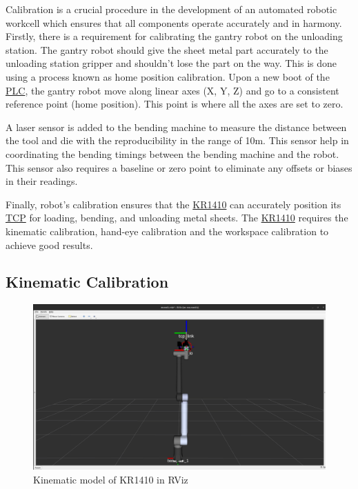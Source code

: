 
Calibration is a crucial procedure in the development of 
an automated robotic workcell which ensures that all components
operate accurately and in harmony. Firstly, there is a requirement for calibrating the gantry robot on the unloading station. The gantry robot should give the sheet metal part accurately to the unloading station gripper and shouldn't lose the part on the way. This is done using a process known as home position calibration. Upon a new boot of the \hyperref[acro:PLC]{PLC}, the gantry robot move along linear axes (X, Y, Z) and go to a consistent reference point (home position). This point is where all the axes are set to zero.

A laser sensor is added to the bending machine to measure the distance between the tool and die with the reproducibility in the range of 10\textmu m. This sensor help in coordinating the bending timings between the bending machine and the robot. This sensor also requires a baseline or zero point to eliminate any offsets or biases in their readings.

Finally, robot's calibration ensures that the \hyperref[acro:KR]{KR1410} can accurately position its \hyperref[acro:TCP]{TCP} for loading, bending, and unloading metal sheets. The \hyperref[acro:KR]{KR1410} requires the kinematic calibration, hand-eye calibration and the workspace calibration to achieve good results.

\subsection{Kinematic Calibration}
\label{subsec:kinematic-calibration}

\begin{figure}[h]
    \centering
    \includegraphics[width=1\textwidth]{6. System Integration and Testing/6.2 Calibration Procedures/tcp.PNG}
    \caption{Kinematic model of KR1410 in RViz}
    \label{fig:tcp}
\end{figure}


